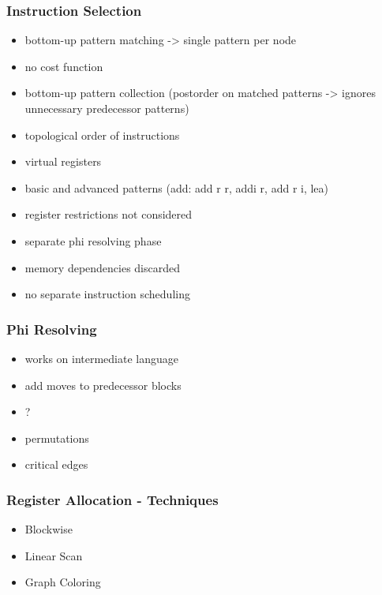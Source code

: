 \documentclass[navbaroff,en]{sdqbeamer}
\begin{document}
\begin{frame}
    \frametitle{Instruction Selection}

    \begin{itemize}
        \item bottom-up pattern matching -> single pattern per node
        \item no cost function
        \item bottom-up pattern collection (postorder on matched patterns -> ignores unnecessary predecessor patterns)
        \item topological order of instructions
        \item virtual registers
        \item basic and advanced patterns (add: add r r, addi r, add r i, lea)
        \item register restrictions not considered
        \item separate phi resolving phase
        \item memory dependencies discarded
        \vspace{1em}
        \item no separate instruction scheduling
    \end{itemize}

\end{frame}

\begin{frame}
    \frametitle{Phi Resolving}

    \begin{itemize}
        \item works on intermediate language
        \item add moves to predecessor blocks
        \item ?
        \item permutations
        \item critical edges
    \end{itemize}

\end{frame}

\begin{frame}
    \frametitle{Register Allocation - Techniques}

    \begin{itemize}
    	\item Blockwise
        \item Linear Scan
        \item Graph Coloring
    \end{itemize}

\end{frame}
\end{document}
